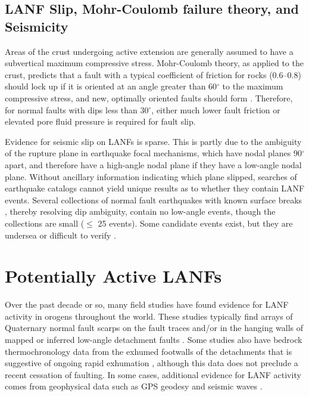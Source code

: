 \documentclass[draft,grl]{AGUTeX}
\begin{document}
\begin{article}
\subsection{LANF Slip, Mohr-Coulomb failure theory, and Seismicity}

Areas of the crust undergoing active extension are generally assumed
to have a subvertical maximum compressive stress.  Mohr-Coulomb
theory, as applied to the crust, predicts that a fault with a typical
coefficient of friction for rocks (0.6--0.8) should lock up if it is
oriented at an angle greater than 60$^\circ$ to the maximum compressive stress,
and new, optimally oriented faults should form \citep{sibson1985}.  Therefore,
for normal faults with dips less than 30$^\circ$, either much lower
fault friction or elevated pore fluid pressure is required for fault slip.

Evidence for seismic slip on LANFs is sparse.  This is partly due to the
ambiguity of the rupture plane in earthquake focal mechanisms, which have
nodal planes 90$^\circ$ apart, and therefore have a
high-angle nodal plane if they have a low-angle nodal plane.  Without
ancillary information indicating which plane slipped, searches of earthquake
catalogs cannot yield unique results as to whether they contain LANF events.
Several collections of normal fault earthquakes
with known surface breaks \citep{jackson1987, collettinisibson2001}, thereby
resolving dip ambiguity, contain no low-angle events, though the collections
are small ($\le$ 25 events).  Some candidate events exist, but they are
undersea \citep[e.g.,][]{abers2001} or difficult to verify \citep[e.g.,]
[]{doser1987ancash}.


\section{Potentially Active LANFs}

Over the past decade or so, many field studies have found evidence for LANF 
activity in orogens throughout the world. These studies typically find arrays of 
Quaternary normal fault scarps on the fault traces and/or in the hanging walls 
of mapped or inferred low-angle detachment faults \citep [e.g.,]
[]{axen1999baja}. Some studies also have bedrock thermochronology data from the 
exhumed footwalls of the detachments that is suggestive of ongoing rapid 
exhumation \citep [e.g.,][]{sundell2013lunggar}, although this data does not 
preclude a recent cessation of faulting. In some cases, additional evidence for 
LANF activity comes from geophysical data such as GPS geodesy \citep [e.g.,]
[]{hreinsdottir2009altotib} and seismic waves \citep [e.g.,][]{doser1987ancash}.


\end{article}
\end{document}
